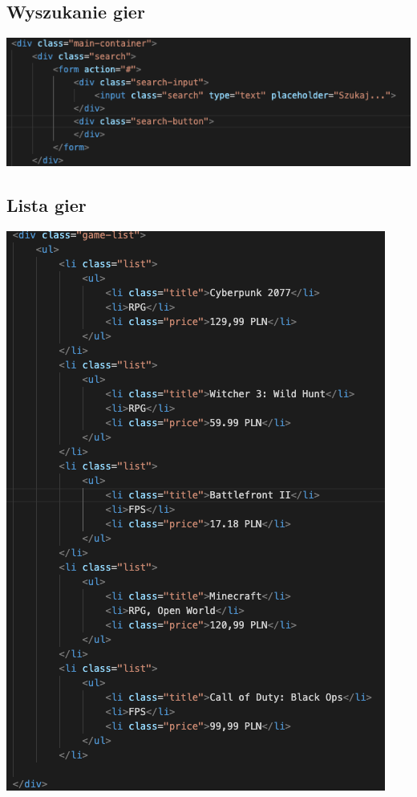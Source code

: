\documentclass[12pt, letterpaper]{article}
\begin{document}
\subsection{Wyszukanie gier}

\begin{center}
	\includegraphics[scale=0.5]{search}
\end{center}

\subsection{Lista gier}

\begin{center}
	\includegraphics[scale=0.5]{games}
\end{center}
\end{document}
